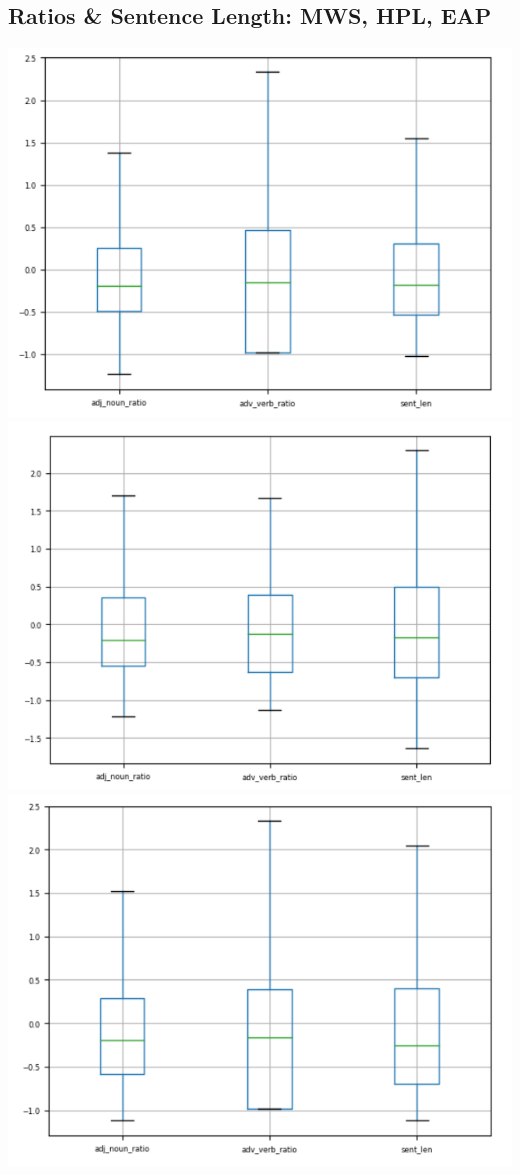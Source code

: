 \documentclass[12pt]{article}
\begin{document}
\subsection{Ratios \& Sentence Length: MWS, HPL, EAP}
\includegraphics[scale=.50, center]{images/ratio_mws.png}
\vskip 0.2in
\includegraphics[scale=.50, center]{images/ratio_hpl.png}
\vskip 0.2in
\includegraphics[scale=.50, center]{images/ratio_eap.png}
\end{document}
